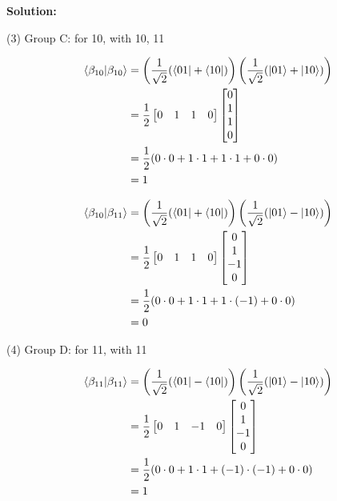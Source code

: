 \documentclass[11pt]{article}
\newenvironment{solution}
{\par\noindent\textbf{Solution:}\par}
{\vspace{1em}}
\begin{document}
\begin{solution}
(3) Group C: for 10, with 10, 11

\[\begin{aligned}
\braket{\beta_{10}}{\beta_{10}} &= \left(\frac{1}{\sqrt{2}}(\bra{01} + \bra{10})\right) \left(\frac{1}{\sqrt{2}}(\ket{01} + \ket{10})\right) \\
&= \frac{1}{2} \begin{bmatrix}0&1&1&0\end{bmatrix} \begin{bmatrix}0\\1\\1\\0\end{bmatrix} \\
&= \frac{1}{2} (0 \cdot 0 + 1 \cdot 1 + 1 \cdot 1 + 0 \cdot 0) \\
&= 1
\end{aligned}\]

\[\begin{aligned}
\braket{\beta_{10}}{\beta_{11}} &= \left(\frac{1}{\sqrt{2}}(\bra{01} + \bra{10})\right) \left(\frac{1}{\sqrt{2}}(\ket{01} - \ket{10})\right) \\
&= \frac{1}{2} \begin{bmatrix}0&1&1&0\end{bmatrix} \begin{bmatrix}0\\1\\-1\\0\end{bmatrix} \\
&= \frac{1}{2} (0 \cdot 0 + 1 \cdot 1 + 1 \cdot (-1) + 0 \cdot 0) \\
&= 0
\end{aligned}\]

(4) Group D: for 11, with 11

\[\begin{aligned}
\braket{\beta_{11}}{\beta_{11}} &= \left(\frac{1}{\sqrt{2}}(\bra{01} - \bra{10})\right) \left(\frac{1}{\sqrt{2}}(\ket{01} - \ket{10})\right) \\
&= \frac{1}{2} \begin{bmatrix}0&1&-1&0\end{bmatrix} \begin{bmatrix}0\\1\\-1\\0\end{bmatrix} \\
&= \frac{1}{2} (0 \cdot 0 + 1 \cdot 1 + (-1) \cdot (-1) + 0 \cdot 0) \\
&= 1
\end{aligned}\]


\end{solution}
\end{document}

